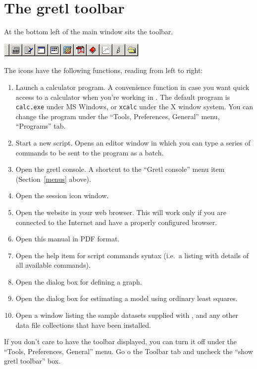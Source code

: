 \section{The gretl toolbar}
\label{toolbar}

At the bottom left of the main window sits the toolbar.

\begin{center}
  \includegraphics[scale=0.75]{figures/toolbar}
\end{center}

The icons have the following functions, reading from left to right:

\begin{enumerate}
\item Launch a calculator program.  A convenience function in case you
  want quick access to a calculator when you're working in
  .  The default program is \verb+calc.exe+ under MS
  Windows, or \verb+xcalc+ under the X window system.  You can change
  the program under the ``Tools, Preferences, General'' menu,
  ``Programs'' tab.
\item Start a new script.  Opens an editor window in which you can
  type a series of commands to be sent to the program as a batch.
\item Open the gretl console.  A shortcut to the ``Gretl console''
  menu item (Section~\ref{menus} above).
\item Open the  session icon window.
\item Open the  website in your web browser.  This will
  work only if you are connected to the Internet and have a properly
  configured browser.
\item Open this manual in PDF format.
\item Open the help item for script commands syntax (i.e.\ a listing
  with details of all available commands).
\item Open the dialog box for defining a graph.
\item Open the dialog box for estimating a model using ordinary least
  squares.
\item Open a window listing the sample datasets supplied with
  , and any other data file collections that have been
  installed.
\end{enumerate}

If you don't care to have the toolbar displayed, you can turn it off
under the ``Tools, Preferences, General'' menu. Go o the Toolbar tab
and uncheck the ``show gretl toolbar'' box.


